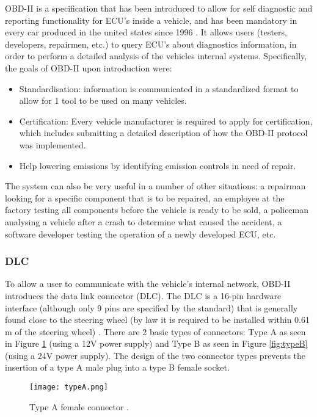 OBD-II is a specification that has been introduced to allow for self diagnostic and reporting functionality for ECU's inside a vehicle, and has been mandatory in every car produced in the united states since 1996 \cite{wiki:OBD}. It allows users (testers, developers, repairmen, etc.) to query ECU's about diagnostics information, in order to perform a detailed analysis of the vehicles internal systems. Specifically, the goals of OBD-II upon introduction were: 
\begin{itemize}
	\item Standardisation: information is communicated in a standardized format to allow for 1 tool to be used on many vehicles.
	\item Certification: Every vehicle manufacturer is required to apply for certification, which includes submitting a detailed description of how the OBD-II protocol was implemented.
	\item Help lowering emissions by identifying emission controls in need of repair.
\end{itemize} 
The system can also be very useful in a number of other situations: a repairman looking for a specific component that is to be repaired, an employee at the factory testing all components before the vehicle is ready to be sold, a policeman analysing a vehicle after a crash to determine what caused the accident, a software developer testing the operation of a newly developed ECU, etc. 

\subsubsection{DLC}
\label{subsec:obd:dlc}

To allow a user to communicate with the vehicle's internal network, OBD-II introduces the data link connector (DLC). The DLC is a 16-pin hardware interface (although only 9 pins are specified by the standard) that is generally found close to the steering wheel (by law it is required to be installed within 0.61 m of the steering wheel) \cite{wiki:OBD}. There are 2 basic types of connectors: Type A as seen in Figure \ref{fig:typeA} (using a 12V power supply) and Type B as seen in Figure \ref{fig:typeB} (using a 24V power supply). The design of the two connector types prevents the insertion of a type A male plug into a type B female socket.

\begin{figure}[h]
	\centering
	\texttt{[image: typeA.png]}
	\caption{Type A female connector \cite{wiki:OBD}.}
	\label{fig:typeA}
\end{figure}

